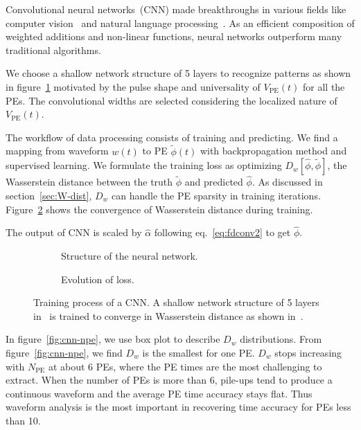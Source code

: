 Convolutional neural networks~(CNN) made breakthroughs in various fields like computer vision~\cite{he_deep_2016} and natural language processing~\cite{vaswani_attention_2017}. As an efficient composition of weighted additions and non-linear functions, neural networks outperform many traditional algorithms.

We choose a shallow network structure of 5 layers to recognize patterns as shown in figure~\ref{fig:struct} motivated by the pulse shape and universality of $V_\mathrm{PE}(t)$ for all the PEs.  The convolutional widths are selected considering the localized nature of $V_\mathrm{PE}(t)$.

The workflow of data processing consists of training and predicting. We find a mapping from waveform $w(t)$ to PE $\tilde{\phi}(t)$ with backpropagation method and supervised learning. We formulate the training loss as optimizing $D_w[\hat{\phi}, \tilde{\phi}] $, the Wasserstein distance between the truth $\tilde{\phi}$ and predicted $\hat{\phi}$. As discussed in section~\ref{sec:W-dist}, $D_w$ can handle the PE sparsity in training iterations. Figure~\ref{fig:loss} shows the convergence of Wasserstein distance during training.

The output of CNN is scaled by $\hat{\alpha}$ following eq.~\eqref{eq:fdconv2} to get $\hat{\phi}$.

\begin{figure}[H]
  \begin{subfigure}{.4\textwidth}
    \centering
    \begin{adjustbox}{width=0.5\textwidth}
      
    \end{adjustbox}
    \caption{\label{fig:struct} Structure of the neural network.}
  \end{subfigure}
  \begin{subfigure}{.5\textwidth}
    \centering
    \resizebox{\textwidth}{!}{}
    \caption{\label{fig:loss} Evolution of loss.}
  \end{subfigure}
  \caption{\label{fig:CNN} Training process of a CNN. A shallow network structure of 5 layers in~ is trained to converge in Wasserstein distance as shown in~.}
\end{figure}

\vspace{-0.5cm}
In figure~\ref{fig:cnn-npe}, we use box plot to describe $D_w$ distributions. From figure~\ref{fig:cnn-npe}, we find $D_w$ is the smallest for one PE.  $D_w$ stops increasing with $N_\mathrm{PE}$ at about 6 PEs, where the PE times are the most challenging to extract.  When the number of PEs is more than 6, pile-ups tend to produce a continuous waveform and the average PE time accuracy stays flat. Thus waveform analysis is the most important in recovering time accuracy for PEs less than 10.

